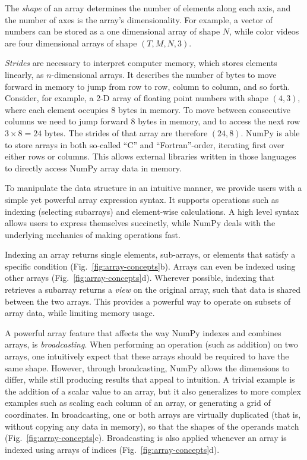 The {\em shape} of an array determines the number of elements along each axis,
and the number of axes is the array's dimensionality.
For example, a vector of numbers can be stored as a one dimensional array of
shape $N$, while color videos are four dimensional arrays of shape
$(T, M, N, 3)$.

{\em Strides} are necessary to interpret computer memory, which stores elements
linearly, as $n$-dimensional arrays.
It describes the number of bytes to move forward in memory to jump from row to
row, column to column, and so forth.
Consider, for example, a 2-D array of floating point numbers with shape
$(4, 3)$, where each element occupies 8 bytes in memory.
To move between consecutive columns we need to jump forward 8 bytes in memory,
and to access the next row $3 \times 8 = 24$ bytes.
The strides of that array are therefore $(24, 8)$.  NumPy is able to
store arrays in both so-called ``C'' and ``Fortran''-order, iterating
first over either rows or columns.  This allows external libraries
written in those languages to directly access NumPy array data in memory.

To manipulate the data structure in an intuitive manner, we provide users with
a simple yet powerful array expression syntax.
It supports operations such as indexing (selecting subarrays) and element-wise
calculations.
A high level syntax allows users to express themselves succinctly, while NumPy
deals with the underlying mechanics of making operations fast.

Indexing an array returns single elements, sub-arrays, or elements that satisfy
a specific condition (Fig.~\ref{fig:array-concepts}b).
Arrays can even be indexed using other arrays (Fig.~\ref{fig:array-concepts}d).
Wherever possible, indexing that retrieves a subarray returns a {\em view} on
the original array, such that data is shared between the two arrays.
This provides a powerful way to operate on subsets of array data, while
limiting memory usage.

A powerful array feature that affects the way NumPy indexes and combines
arrays, is {\em broadcasting}.
When performing an operation (such as addition) on two arrays, one intuitively
expect that these arrays should be required to have the same shape.
However, through broadcasting, NumPy allows the dimensions to differ, while
still producing results that appeal to intuition.
A trivial example is the addition of a scalar value to an array, but it also
generalizes to more complex examples such as scaling each column of an array,
or generating a grid of coordinates.
In broadcasting, one or both arrays are virtually duplicated (that is, without
copying any data in memory), so that the shapes of the operands match
(Fig.~\ref{fig:array-concepts}c).
Broadcasting is also applied whenever an array is indexed using arrays of
indices (Fig.~\ref{fig:array-concepts}d).

